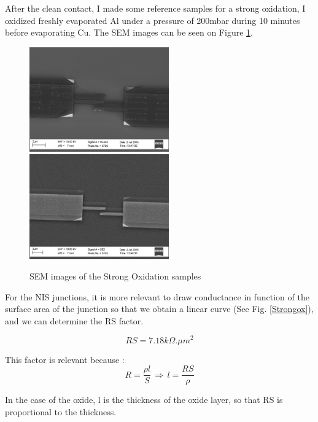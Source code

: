            
                After the clean contact, I made some reference samples for a strong oxidation, I oxidized freshly evaporated Al under a pressure of 200mbar during 10 minutes before evaporating Cu. The SEM images can be seen on Figure \ref{SEMstrongox}.
                
                \begin{figure}
                    \centering
                    \includegraphics[width=6cm]{SEMtest15_1.png}
                    \includegraphics[width=6cm]{SEMtest15_2.png}
                    \caption{SEM images of the Strong Oxidation samples}
                    \label{SEMstrongox}
                \end{figure}
                
                For the NIS junctions, it is more relevant to draw conductance in function of the surface area of the junction so that we obtain a linear curve (See Fig. \ref{Strongox}), and we can determine the RS factor.
                
                \[RS=7.18k\Omega.\mu m^2\]
                
                This factor is relevant because : 
                \[R=\dfrac{\rho l}{S}\,\Longrightarrow\,l=\dfrac{RS}{\rho}\]
                
                In the case of the oxide, l is the thickness of the oxide layer, so that RS is proportional to the thickness.   
                
